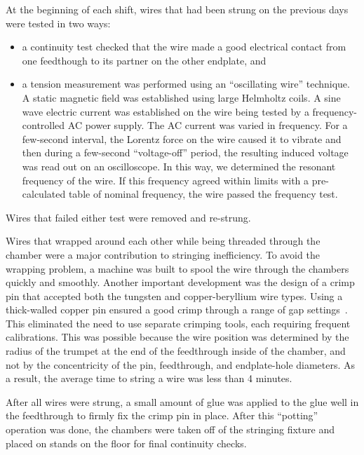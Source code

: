 At the beginning of each shift, wires that had been strung on the previous days
were tested in two ways:
\begin{itemize}
\item a continuity test checked that the wire made a good electrical contact
from one feedthough to its partner on the other endplate, and
\item a tension measurement was performed using an ``oscillating wire'' technique.
A static magnetic field was established using large Helmholtz coils.  A sine
wave electric current was established on the wire being tested by a frequency-controlled 
AC power supply.  The AC current was varied in frequency.  For a 
few-second interval, the Lorentz force on the wire caused it to vibrate and
then during a few-second ``voltage-off'' period, the resulting induced voltage
was read out on an oscilloscope.  In this way, we determined the resonant frequency
of the wire.  If this frequency agreed within limits with a pre-calculated
table of nominal frequency, the wire passed the frequency test.
\end{itemize}
Wires that failed either test were removed and re-strung.

  Wires that wrapped around each other while being threaded through the chamber 
were a major contribution to stringing inefficiency. To avoid the wrapping
problem, a machine was built to spool the wire through the chambers quickly and smoothly.
Another important development was the design of a crimp pin 
that accepted both the tungsten and copper-beryllium wire types.  Using a 
thick-walled 
copper pin ensured a good crimp through a range of gap settings~\cite{sbc}.  This 
eliminated the need to use separate crimping tools, each requiring frequent 
calibrations.  This was possible because the wire position was determined by the 
radius of the trumpet at the end of the feedthrough inside of the chamber, and 
not by the concentricity of the pin, feedthrough, and endplate-hole diameters. 
As a result, the average time to string a wire was less than 4 minutes.

After all wires were strung,
a small amount of glue was applied to the glue well
in the feedthrough to firmly fix the crimp pin in place.  After this ``potting''
operation was done, the chambers were taken off of the stringing fixture and
placed on stands on the floor for final continuity checks.









